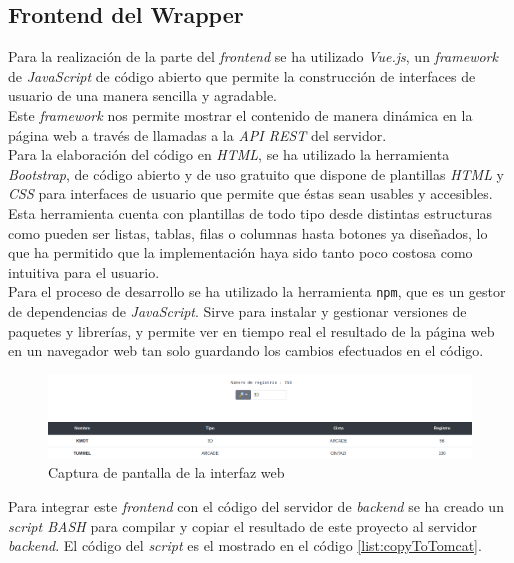 \documentclass[10pt,a4paper]{article}
\begin{document}
\subsection{Frontend del Wrapper}

Para la realización de la parte del \emph{frontend} se ha utilizado \emph{Vue.js}, un \emph{framework} de \emph{JavaScript} de código abierto que permite la construcción de interfaces de usuario de una manera sencilla y agradable. \\ 
Este \emph{framework} nos permite mostrar el contenido de manera dinámica en la página web a través de llamadas a la \emph{API REST} del servidor.\\
Para la elaboración del código en \emph{HTML}, se ha utilizado la herramienta \emph{Bootstrap}, de código abierto y de uso gratuito que dispone de plantillas \emph{HTML} y \emph{CSS} para interfaces de usuario que permite que éstas sean usables y accesibles. Esta herramienta cuenta con plantillas de todo tipo desde distintas estructuras como pueden ser listas, tablas, filas o columnas hasta botones ya diseñados, lo que ha permitido que la implementación haya sido tanto poco costosa como intuitiva para el usuario.\\
Para el proceso de desarrollo se ha utilizado la herramienta \texttt{npm}, que es un gestor de dependencias de \emph{JavaScript}. Sirve para instalar y gestionar versiones de paquetes y librerías, y permite ver en tiempo real el resultado de la página web en un navegador web tan solo guardando los cambios efectuados en el código.\\

\begin{figure}[h!]
\centering
\includegraphics[scale=0.4]{images/cap_legados_web.png}
\caption{Captura de pantalla de la interfaz web}
\label{fig:aplicacion_legada_web}
\end{figure}
\newpage
Para integrar este \emph{frontend} con el código del servidor de \emph{backend} se ha creado un \emph{script BASH} para compilar y copiar el resultado de este proyecto al servidor \emph{backend}. El código del \emph{script} es el mostrado en el código \ref{list:copyToTomcat}.


\end{document}
